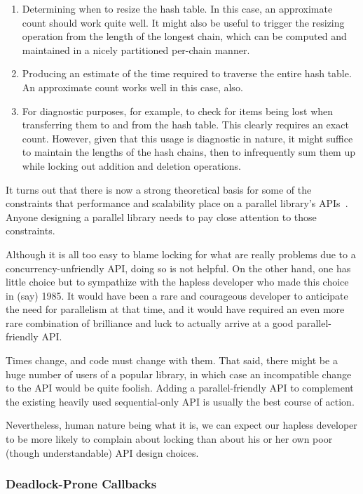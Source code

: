 \begin{enumerate}
\item	Determining when to resize the hash table.
	In this case, an approximate count should work quite well.
	It might also be useful to trigger the resizing operation from
	the length of the longest chain, which can be computed and
	maintained in a nicely partitioned per-chain manner.
\item	Producing an estimate of the time required to traverse the
	entire hash table.
	An approximate count works well in this case, also.
\item	For diagnostic purposes, for example, to check for items being
	lost when transferring them to and from the hash table.
	This clearly requires an exact count.
	However, given that this usage is diagnostic in nature, it might
	suffice to maintain the lengths of the hash chains, then to
	infrequently sum them
	up while locking out addition and deletion operations.
\end{enumerate}

It turns out that there is now a strong theoretical basis for some of the
constraints that performance and scalability place on a parallel library's
APIs~\cite{HagitAttiya2011LawsOfOrder,Attiya:2011:LOE:1925844.1926442,PaulEMcKenney2011SNC}.
Anyone designing a parallel library needs to pay close attention to
those constraints.

Although it is all too easy to blame locking for what are really problems
due to a concurrency-unfriendly API, doing so is not helpful.
On the other hand, one has little choice but to sympathize with the
hapless developer who made this choice in (say) 1985.
It would have been a rare and courageous developer to anticipate the
need for parallelism at that time, and it would have required an
even more rare combination of brilliance and luck to actually arrive
at a good parallel-friendly API\@.

Times change, and code must change with them.
That said, there might be a huge number of users of a popular library,
in which case an incompatible change to the API would be quite foolish.
Adding a parallel-friendly API to complement the existing heavily used
sequential-only API is usually the best course of action.

Nevertheless, human nature being what it is, we can expect our hapless
developer to be more likely to complain about locking than about his
or her own poor (though understandable) API design choices.

\subsubsection{Deadlock-Prone Callbacks}
\label{sec:locking:Deadlock-Prone Callbacks}

